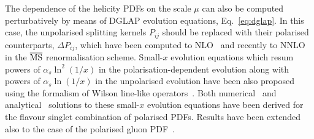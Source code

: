 The dependence of the helicity PDFs on the 
scale $\mu$ can also be computed perturbatively by means of DGLAP evolution 
equations, Eq.~\eqref{eq:dglap}.
%
In this case, the unpolarised splitting kernels $P_{ij}$ should be replaced with their
polarised counterparts, $\Delta P_{ij}$, which have been computed to 
NLO~\cite{Mertig:1995ny,Vogelsang:1995vh,Vogelsang:1996im}
and recently to NNLO~\cite{Moch:2014sna} in the $\overline{\rm MS}$ 
renormalisation scheme.
%
Small-$x$ evolution equations which resum powers of $\alpha_s\ln^2(1/x)$
in the polarisation-dependent evolution along with powers of $\alpha_s\ln(1/x)$
in the unpolarised evolution have been also proposed using the formalism
of Wilson line-like operators~\cite{Kovchegov:2015pbl}.
%
Both numerical~\cite{Kovchegov:2016weo}
and analytical~\cite{Kovchegov:2016zex,Kovchegov:2017jxc}
solutions to these small-$x$ evolution equations have been derived
for the flavour singlet combination of polarised PDFs.
%
Results have been extended also to the case of the polarised gluon 
PDF~\cite{Kovchegov:2017lsr}.
